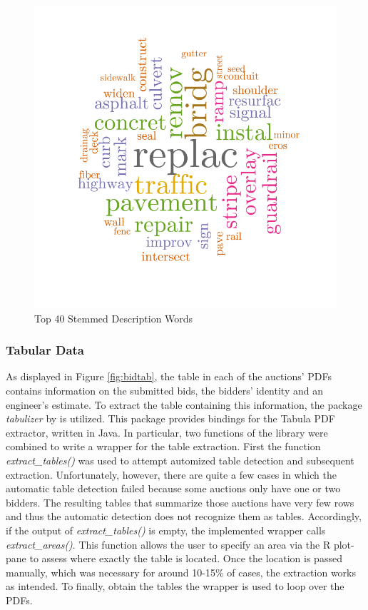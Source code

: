 \documentclass[a4paper,12pt, headsepline]{scrartcl}
\numberwithin{equation}{section}
\begin{document}
\begin{figure}[H]
	\includegraphics[width = 13.4	cm]{figures/description_words_cloud.pdf}
	\caption{Top 40 Stemmed Description Words}\label{fig:desc}
\end{figure}

\subsubsection{Tabular Data}\label{subsec:tab}

As displayed in Figure \ref{fig:bidtab}, the table in each of the auctions' PDFs contains information on the submitted bids, the bidders' identity and an engineer's estimate. To extract the table containing this information, the package \textit{tabulizer} by \citet{tabulizer} is utilized. This package provides bindings for the Tabula PDF extractor, written in Java. In particular, two functions of the library were combined to write a wrapper for the table extraction. First the function \textit{extract\_tables()} was used to attempt automized table detection and subsequent extraction. Unfortunately, however, there are quite a few cases in which the automatic table detection failed because some auctions only have one or two bidders. The resulting tables that summarize those auctions have very few rows and thus the automatic detection does not recognize them as tables. Accordingly, if the output of \textit{extract\_tables()} is empty, the implemented wrapper calls \textit{extract\_areas()}. This function allows the user to specify an area via the R plot-pane to assess where exactly the table is located. Once the location is passed manually, which was necessary for around 10-15\% of cases, the extraction works as intended. To finally, obtain the tables the wrapper is used to loop over the PDFs.
\end{document}
